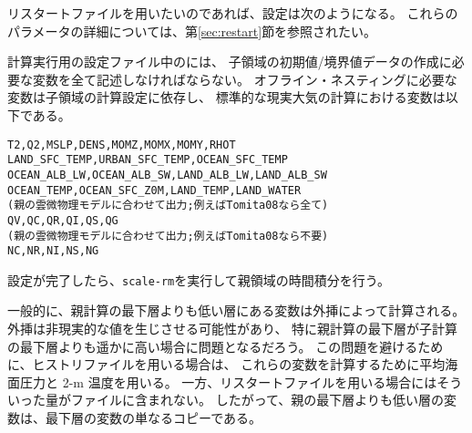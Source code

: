 リスタートファイルを用いたいのであれば、設定は次のようになる。
これらのパラメータの詳細については、第\ref{sec:restart}節を参照されたい。

計算実行用の設定ファイル中のには、
子領域の初期値/境界値データの作成に必要な変数を全て記述しなければならない。
オフライン・ネスティングに必要な変数は子領域の計算設定に依存し、
標準的な現実大気の計算における変数は以下である。
\begin{alltt}
  T2, Q2, MSLP, DENS, MOMZ, MOMX, MOMY, RHOT
  LAND_SFC_TEMP, URBAN_SFC_TEMP, OCEAN_SFC_TEMP
  OCEAN_ALB_LW, OCEAN_ALB_SW, LAND_ALB_LW, LAND_ALB_SW
  OCEAN_TEMP, OCEAN_SFC_Z0M, LAND_TEMP, LAND_WATER
(親の雲微物理モデルに合わせて出力; 例えばTomita08なら全て)
  QV, QC, QR, QI, QS, QG
(親の雲微物理モデルに合わせて出力; 例えばTomita08なら不要)
  NC, NR, NI, NS, NG
\end{alltt}
設定が完了したら、\verb|scale-rm|を実行して親領域の時間積分を行う。

一般的に、親計算の最下層よりも低い層にある変数は外挿によって計算される。
外挿は非現実的な値を生じさせる可能性があり、
特に親計算の最下層が子計算の最下層よりも遥かに高い場合に問題となるだろう。
この問題を避けるために、ヒストリファイルを用いる場合は、
これらの変数を計算するために平均海面圧力と 2-m 温度を用いる。
一方、リスタートファイルを用いる場合にはそういった量がファイルに含まれない。
したがって、親の最下層よりも低い層の変数は、最下層の変数の単なるコピーである。

